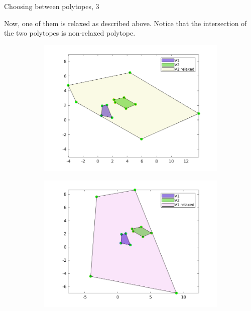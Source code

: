 \documentclass{beamer}
\begin{document}
\begin{frame}{Choosing between polytopes, 3}
\begin{flushleft}

Now, one of them is relaxed as described above. Notice that the intersection of the two polytopes is non-relaxed polytope. 

\begin{figure}
\centering
\begin{subfigure}{.5\textwidth}
  \centering
  \includegraphics[width=1.1\linewidth]{fig2.png}
\end{subfigure}%
\begin{subfigure}{.5\textwidth}
  \centering
  \includegraphics[width=1.1\linewidth]{fig3.png}
\end{subfigure}
\end{figure}

\end{flushleft}
\end{frame}
\end{document}

